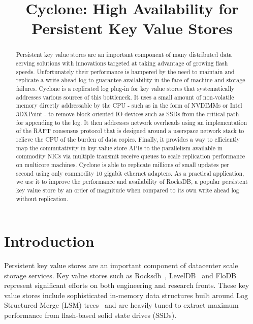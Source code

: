 \documentclass[pageno]{jpaper}
\begin{document}
\title{\Large \bf Cyclone: High Availability for Persistent Key Value Stores}


\date{}
\maketitle

\thispagestyle{empty}

\begin{abstract}
\vspace{0.1in}
Persistent key value stores are an important component of many distributed data
serving solutions with innovations targeted at taking advantage of growing flash
speeds. Unfortunately their performance is hampered by the need to maintain and
replicate a write ahead log to guarantee availability in the face of machine and
storage failures. Cyclone is a replicated log plug-in for key value stores that
systematically addresses various sources of this bottleneck. It uses a small
amount of non-volatile memory directly addressable by the CPU - such as in the
form of NVDIMMs or Intel 3DXPoint - to remove block oriented IO devices such as
SSDs from the critical path for appending to the log. It then addresses network
overheads using an implementation of the RAFT consensus protocol that is
designed around a userspace network stack to relieve the CPU of the burden of
data copies. Finally, it provides a way to efficiently map the commutativity in
key-value store APIs to the parallelism available in commodity NICs via multiple
transmit receive queues to scale replication performance on multicore
machines. Cyclone is able to replicate millions of small updates per second
using only commodity 10 gigabit ethernet adapters. As a practical application,
we use it to improve the performance and availability of RocksDB, a popular
persistent key value store by an order of magnitude when compared to its own
write ahead log without replication.
\end{abstract}

\section{Introduction}
Persistent key value stores are an important component of datacenter scale
storage services. Key value stores such as Rocksdb~\cite{rocksdb},
LevelDB~\cite{leveldb} and FloDB~\cite{flodb} represent significant efforts on
both engineering and research fronts. These key value stores include
sophisticated in-memory data structures built around Log Structured Merge (LSM)
trees~\cite{lsmtree} and are heavily tuned to extract maximum performance from
flash-based solid state drives (SSDs).
\end{document}
